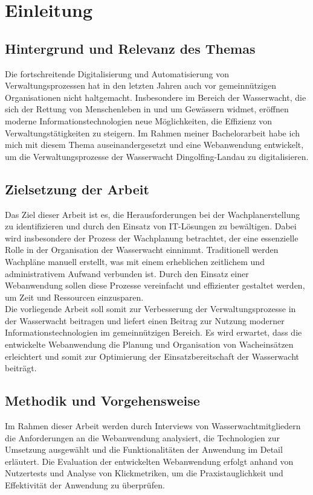 \documentclass[fontsize=12pt,openright,oneside,paper=a4,BCOR=1cm]{scrbook}
\begin{document}



\tableofcontents

\listoffigures

%
%

\chapter{Einleitung}
\section{Hintergrund und Relevanz des Themas}
Die fortschreitende Digitalisierung und Automatisierung von Verwaltungsprozessen hat in den letzten Jahren auch vor gemeinnützigen Organisationen nicht haltgemacht. Insbesondere im Bereich der Wasserwacht, die sich der Rettung von Menschenleben in und um Gewässern widmet, eröffnen moderne Informationstechnologien neue Möglichkeiten, die Effizienz von Verwaltungstätigkeiten zu steigern. Im Rahmen meiner Bachelorarbeit habe ich mich mit diesem Thema auseinandergesetzt und eine Webanwendung entwickelt, um die Verwaltungsprozesse der Wasserwacht Dingolfing-Landau zu digitalisieren. 
\section{Zielsetzung der Arbeit}
Das Ziel dieser Arbeit ist es, die Herausforderungen bei der Wachplanerstellung zu identifizieren und durch den Einsatz von IT-Lösungen zu bewältigen. Dabei wird insbesondere der Prozess der Wachplanung betrachtet, der eine essenzielle Rolle in der Organisation der Wasserwacht einnimmt. Traditionell werden Wachpläne manuell erstellt, was mit einem erheblichen zeitlichem und administrativem Aufwand verbunden ist. Durch den Einsatz einer Webanwendung sollen diese Prozesse vereinfacht und effizienter gestaltet werden, um Zeit und Ressourcen einzusparen. \\
Die vorliegende Arbeit soll somit zur Verbesserung der Verwaltungsprozesse in der Wasserwacht beitragen und liefert einen Beitrag zur Nutzung moderner Informationstechnologien im gemeinnützigen Bereich. Es wird erwartet, dass die entwickelte Webanwendung die Planung und Organisation von Wacheinsätzen erleichtert und somit zur Optimierung der Einsatzbereitschaft der Wasserwacht beiträgt. 
\section{Methodik und Vorgehensweise}
Im Rahmen dieser Arbeit werden durch Interviews von Wasserwachtmitgliedern die Anforderungen an die Webanwendung analysiert, die Technologien zur Umsetzung ausgewählt und die Funktionalitäten der Anwendung im Detail erläutert. Die Evaluation der entwickelten Webanwendung erfolgt anhand von Nutzertests und Analyse von Klickmetriken, um die Praxistauglichkeit und Effektivität der Anwendung zu überprüfen. 
\end{document}
